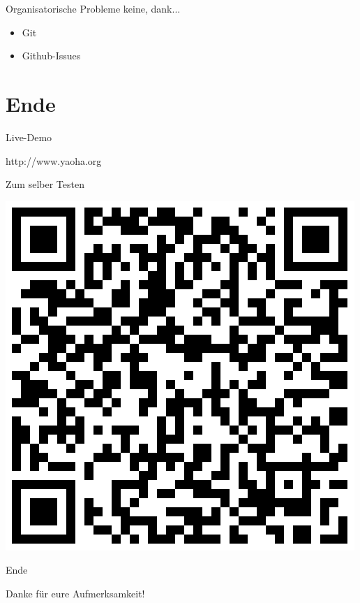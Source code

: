 \documentclass[hyperref]{beamer}
\begin{document}
\begin{frame}{Organisatorische Probleme}
	keine, dank...
	\begin{itemize}
		\item Git
		\item Github-Issues
	\end{itemize}
\end{frame}

\section{Ende}

\begin{frame}{Live-Demo}
	\begin{center}
		http://www.yaoha.org
	\end{center}
\end{frame}

\begin{frame}{Zum selber Testen}
	\begin{center}
		\includegraphics[scale=0.35]{QR-to-YAOHA.png}	
	\end{center}
\end{frame}

\begin{frame}{Ende}
	\begin{center}
		Danke für eure Aufmerksamkeit!
	\end{center}
\end{frame}
\end{document}
